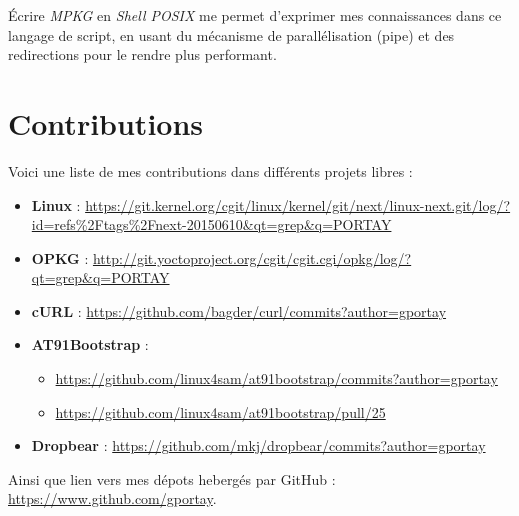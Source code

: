 \documentclass[a4paper]{article}
\begin{document}
Écrire \textit{MPKG} en \textit{Shell POSIX} me permet d'exprimer mes connaissances dans ce langage de script, en usant du mécanisme de parallélisation (pipe) et des redirections pour le rendre plus performant.
\clearpage

\appendix
\section{Contributions}
Voici une liste de mes contributions dans différents projets libres :
\begin{itemize}
\item \textbf{Linux} : \url{https://git.kernel.org/cgit/linux/kernel/git/next/linux-next.git/log/?id=refs\%2Ftags\%2Fnext-20150610&qt=grep&q=PORTAY}
\item \textbf{OPKG} : \url{http://git.yoctoproject.org/cgit/cgit.cgi/opkg/log/?qt=grep&q=PORTAY}
\item \textbf{cURL} : \url{https://github.com/bagder/curl/commits?author=gportay}
\item \textbf{AT91Bootstrap} :
\begin{itemize}
\item \url{https://github.com/linux4sam/at91bootstrap/commits?author=gportay}
\item \url{https://github.com/linux4sam/at91bootstrap/pull/25}
\end{itemize}
\item \textbf{Dropbear} : \url{https://github.com/mkj/dropbear/commits?author=gportay}
\end{itemize}
Ainsi que lien vers mes dépots hebergés par GitHub : \url{https://www.github.com/gportay}.
\end{document}
